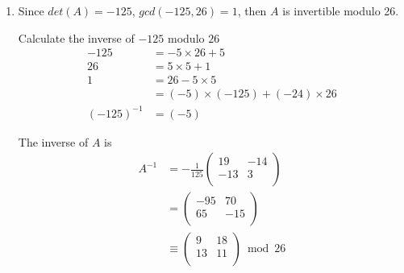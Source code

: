 \documentclass[12pt]{article}
\begin{document}
\begin{enumerate}
\begin{enumerate}
		\item Since $det(A)=-125$, $gcd(-125, 26)=1$, then $A$ is invertible modulo 26. 

		Calculate the inverse of $-125$ modulo $26$
		\begin{align*}
			-125 &= -5 \times 26 + 5\\
			26 &= 5 \times 5 + 1\\
			1 &= 26 - 5 \times 5\\
			&= (-5) \times (-125) + (-24) \times 26\\
			(-125)^{-1} &= (-5)
		\end{align*}

		The inverse of $A$ is
		\begin{align*}
			A^{-1} &=
			-\frac{1}{125}
			\begin{pmatrix}
				19 & -14\\
				-13 & 3\\
			\end{pmatrix}
			\\
			&=
			\begin{pmatrix}
				-95 & 70\\
				65 & -15\\
			\end{pmatrix}
			\\
			&\equiv
			\begin{pmatrix}
				9 & 18\\
				13 & 11\\
			\end{pmatrix}
			\bmod 26
		\end{align*}


\end{enumerate}
\end{enumerate}
\end{document}
